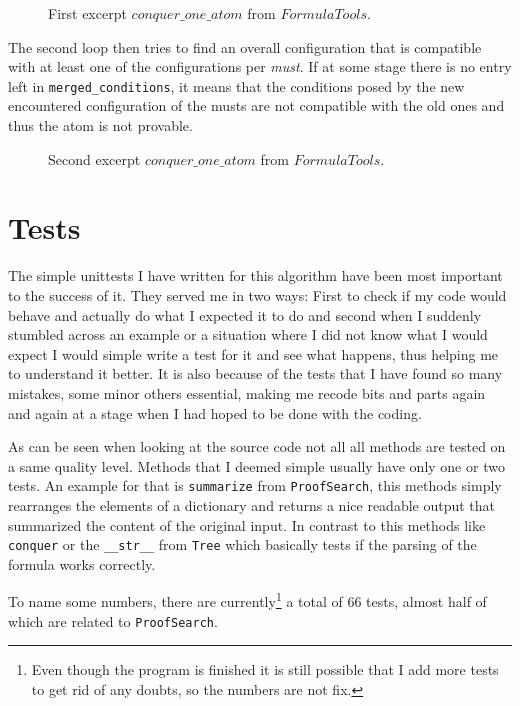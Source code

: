 \begin{figure}[H]
	\caption{First excerpt $conquer\_one\_ atom$ from $FormulaTools$.}
	\vspace{-10pt}
	
	\vspace{-10pt}
\end{figure}

The second loop then tries to find an overall configuration that is compatible with at least one of the configurations per \emph{must}. If at some stage there is no entry left in \texttt{merged\_conditions}, it means that the conditions posed by the new encountered configuration of the musts are not compatible with the old ones and thus the atom is not provable.

\begin{figure}[H]
	\caption{Second excerpt $conquer\_one\_ atom$ from $FormulaTools$.}
	\vspace{-10pt}
	
	\vspace{-10pt}
\end{figure}

\bigskip


\section{Tests}
The simple unittests I have written for this algorithm have been most important to the success of it. They served me in two ways: First to check if my code would behave and actually do what I expected it to do and second when I suddenly stumbled across an example or a situation where I did not know what I would expect I would simple write a test for it and see what happens, thus helping me to understand it better.
It is also because of the tests that I have found so many mistakes, some minor others essential, making me recode bits and parts again and again at a stage when I had hoped to be done with the coding.

As can be seen when looking at the source code not all all methods are tested on a same quality level. Methods that I deemed simple usually have only one or two tests. An example for that is \texttt{summarize} from \texttt{ProofSearch}, this methods simply rearranges the elements of a dictionary and returns a nice readable output that summarized the content of the original input. In contrast to this methods like \texttt{conquer} or the \texttt{\_\_str\_\_} from \texttt{Tree} which basically tests if the parsing of the formula works correctly.

To name some numbers, there are currently\footnote{Even though the program is finished it is still possible that I add more tests to get rid of any doubts, so the numbers are not fix.} a total of 66 tests, almost half of which are related to \texttt{ProofSearch}. 
